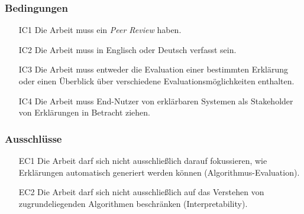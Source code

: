 \subsubsection{Bedingungen}

\begin{enumerate}
    \item[IC1] Die Arbeit muss ein \textit{Peer Review} haben.
    \item[IC2] Die Arbeit muss in Englisch oder Deutsch verfasst sein.
    \item[IC3] Die Arbeit muss entweder die Evaluation einer bestimmten Erklärung oder einen Überblick über verschiedene Evaluationsmöglichkeiten enthalten.
    \item[IC4] Die Arbeit muss End-Nutzer von erklärbaren Systemen als Stakeholder von Erklärungen in Betracht ziehen.
\end{enumerate}

\subsubsection{Ausschlüsse}

\begin{enumerate}
    \item[EC1] Die Arbeit darf sich nicht ausschließlich darauf fokussieren, wie Erklärungen automatisch generiert werden können (Algorithmus-Evaluation).
    \item[EC2] Die Arbeit darf sich nicht ausschließlich auf das Verstehen von zugrundeliegenden Algorithmen beschränken (Interpretability).
\end{enumerate}
